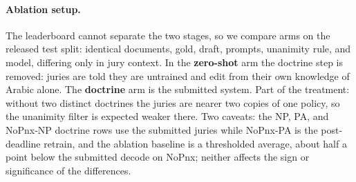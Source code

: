 \documentclass[11pt]{article}
\begin{document}
\paragraph{Ablation setup.}
The leaderboard cannot separate the two stages, so we compare arms on the released
test split: identical documents, gold, draft, prompts, unanimity rule, and model,
differing only in jury context. In the \textbf{zero-shot} arm the doctrine step is
removed: juries are told they are untrained and edit from their own knowledge of
Arabic alone. The
\textbf{doctrine} arm is the submitted system. Part of the treatment: without two distinct doctrines the juries are nearer two
copies of one policy, so the unanimity filter is expected weaker there.
Two caveats: the NP, PA, and NoPnx-NP doctrine rows use the submitted juries while
NoPnx-PA is the post-deadline retrain, and the ablation baseline is a
thresholded average, about half a point below the submitted decode on NoPnx; neither
affects the sign or significance of the differences.
\begin{table}[t]
\centering
\scriptsize
\setlength{\tabcolsep}{2pt}
\caption{Ablation on the 262-document released test split (macro $F_1$, organizers'
script, strict exact-index application). Jury arms share model, documents, draft,
prompts, and unanimity rule, differing only in jury context: nothing, or the learned
doctrine. Submitted systems are ensemble + doctrine juries; the NoPnx-PA doctrine row
is a post-deadline retrain.}
\label{tab:ablation}
\end{table}
\end{document}
